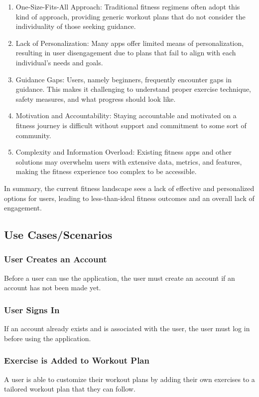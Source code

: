 \documentclass[12pt]{article}
\begin{document}
\begin{enumerate}
  \item One-Size-Fits-All Approach: Traditional fitness regimens often adopt this kind of approach, providing generic workout plans that do not consider the individuality of those seeking guidance.
  \item Lack of Personalization: Many apps offer limited means of personalization, resulting in user disengagement due to plans that fail to align with each individual’s needs and goals.
  \item Guidance Gaps: Users, namely beginners, frequently encounter gaps in guidance. This makes it challenging to understand proper exercise technique, safety measures, and what progress should look like.
  \item Motivation and Accountability: Staying accountable and motivated on a fitness journey is difficult without support and commitment to some sort of community.
  \item Complexity and Information Overload: Existing fitness apps and other solutions may overwhelm users with extensive data, metrics, and features, making the fitness experience too complex to be accessible.
\end{enumerate}

In summary, the current fitness landscape sees a lack of effective and personalized options for users, leading to less-than-ideal fitness outcomes and an overall lack of engagement.

\subsection{Use Cases/Scenarios}

\subsubsection{User Creates an Account}
Before a user can use the application, the user must create an account if an account has not been made yet.

\subsubsection{User Signs In}
If an account already exists and is associated with the user, the user must log in before using the application.

\subsubsection{Exercise is Added to Workout Plan}
A user is able to customize their workout plans by adding their own exercises to a tailored workout plan that they can follow.
\end{document}
